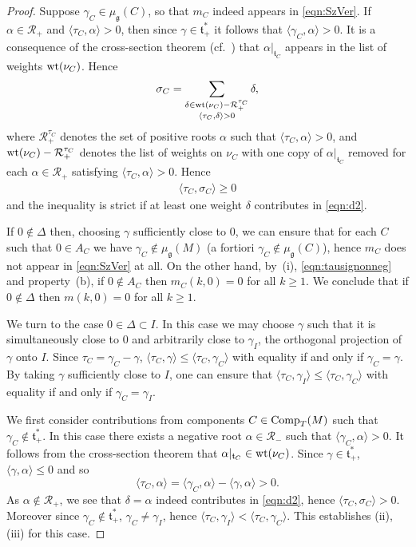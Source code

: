 \documentclass[pdftex]{sigma}
\numberwithin{equation}{section}
\newcommand{\pair}[2]{\langle #1, #2 \rangle}
\newcommand{\tn}[1]{\textnormal{#1}}
\def\g{\ensuremath{\mathfrak{g}}}
\def\t{\ensuremath{\mathfrak{t}}}
\def\R{\ensuremath{\mathcal{R}}}
\begin{document}
\begin{proof}
Suppose $\gamma_C \in \mu_\g(C)$, so that $m_C$ indeed appears in \eqref{eqn:SzVer}. If $\alpha \in \R_+$ and $\pair{\tau_C}{\alpha}>0$, then since $\gamma \in \t^\ast_+$ it follows that $\pair{\gamma_C}{\alpha}>0$. It is a consequence of the cross-section theorem (cf.~\cite{ConvexitySympCuts}) that $\alpha|_{\t_C}$ appears in the list of weights $\tn{wt}(\nu_C)$. Hence
\begin{gather}\label{eqn:d2}
\sigma_C=\sum_{\substack{\delta \in \tn{wt}(\nu_C)-\R_+^{\tau_C}\\ \pair{\tau_C}{\delta}>0}} \delta,
\end{gather}
where $\R_+^{\tau_C}$ denotes the set of positive roots $\alpha$ such that $\pair{\tau_C}{\alpha}>0$, and $\tn{wt}(\nu_C)-\R_+^{\tau_C}$ denotes the list of weights on $\nu_C$ with one copy of $\alpha|_{\t_C}$ removed for each $\alpha \in \R_+$ satisfying $\pair{\tau_C}{\alpha}>0$. Hence{\samepage
\begin{gather}\label{eqn:tausignonneg}
\pair{\tau_C}{\sigma_C}\ge 0
\end{gather}
and the inequality is strict if at least one weight $\delta$ contributes in \eqref{eqn:d2}.}

If $0 \notin \Delta$ then, choosing $\gamma$ sufficiently close to $0$, we can ensure that for each $C$ such that $0 \in A_C$ we have $\gamma_C \notin \mu_\g(M)$ (a fortiori $\gamma_C \notin \mu_\g(C)$), hence $m_C$ does not appear in \eqref{eqn:SzVer} at all. On the other hand, by~(i), \eqref{eqn:tausignonneg} and property~(b), if $0 \notin A_C$ then $m_C(k,0)=0$ for all $k \ge 1$. We conclude that if $0 \notin \Delta$ then $m(k,0)=0$ for all $k \ge 1$.

We turn to the case $0 \in \Delta \subset I$. In this case we may choose $\gamma$ such that it is simultaneously close to $0$ and arbitrarily close to $\gamma_I$, the orthogonal projection of $\gamma$ onto $I$. Since $\tau_C=\gamma_C-\gamma$, $\pair{\tau_C}{\gamma}\le \pair{\tau_C}{\gamma_C}$ with equality if and only if $\gamma_C=\gamma$. By taking $\gamma$ sufficiently close to $I$, one can ensure that $\pair{\tau_C}{\gamma_I}\le \pair{\tau_C}{\gamma_C}$ with equality if and only if $\gamma_C=\gamma_I$.

We first consider contributions from components $C \in \tn{Comp}_T(M)$ such that $\gamma_C \notin \t_+^\ast$. In this case there exists a negative root $\alpha \in \R_-$ such that $\pair{\gamma_C}{\alpha}>0$. It follows from the cross-section theorem that $\alpha|_{\t_C} \in \tn{wt}(\nu_C)$. Since $\gamma \in \t_+^\ast$, $\pair{\gamma}{\alpha}\le 0$ and so
\[ \pair{\tau_C}{\alpha}=\pair{\gamma_C}{\alpha}-\pair{\gamma}{\alpha}>0. \]
As $\alpha \notin \R_+$, we see that $\delta=\alpha$ indeed contributes in \eqref{eqn:d2}, hence $\pair{\tau_C}{\sigma_C}>0$. Moreover since $\gamma_C \notin \t_+^\ast$, $\gamma_C \ne \gamma_I$, hence $\pair{\tau_C}{\gamma_I}<\pair{\tau_C}{\gamma_C}$. This establishes (ii), (iii) for this case.


\end{proof}
\end{document}
